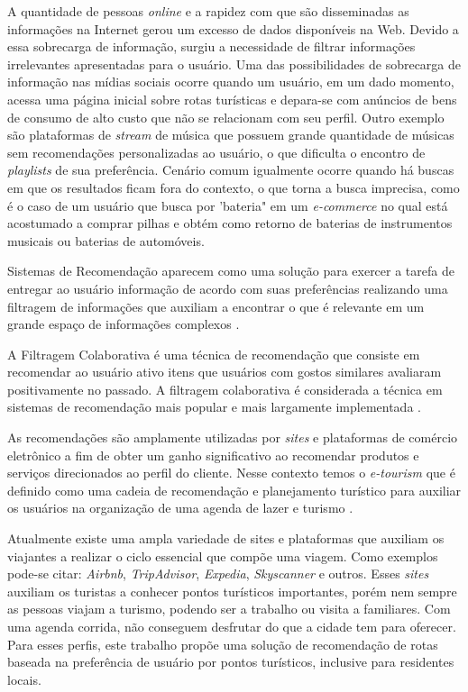 \documentclass[portuguese]{textolivre}
\begin{document}
A quantidade de pessoas \textit{online} e a rapidez com que são disseminadas as informações na Internet gerou um excesso de dados disponíveis na Web. Devido a essa sobrecarga de informação, surgiu a necessidade de filtrar informações irrelevantes apresentadas para o usuário. Uma das possibilidades de sobrecarga de informação nas mídias sociais ocorre quando um usuário, em um dado momento, acessa uma página inicial sobre rotas turísticas e depara-se com anúncios de bens de consumo de alto custo que não se relacionam com seu perfil. Outro exemplo são plataformas de \textit{stream} de música que possuem grande quantidade de músicas sem recomendações personalizadas ao usuário, o que dificulta o encontro de \textit{playlists} de sua preferência. Cenário comum igualmente ocorre quando há buscas em que os resultados ficam fora do contexto, o que torna a busca imprecisa, como é o caso de um usuário que busca por 'bateria" em um \textit{e-commerce} no qual está acostumado a comprar pilhas e obtém como retorno de baterias de instrumentos musicais ou baterias de automóveis.

Sistemas de Recomendação aparecem como uma solução para exercer a tarefa de entregar ao usuário informação de acordo com suas preferências realizando uma filtragem de informações que auxiliam a encontrar o que é relevante em um grande espaço de informações complexos \cite{DiNoia2015}.

A Filtragem Colaborativa é uma técnica de recomendação que consiste em recomendar ao usuário ativo itens que usuários com gostos similares avaliaram positivamente no passado. A filtragem colaborativa é considerada a técnica em sistemas de recomendação mais popular e mais largamente implementada \cite{Ricci:2010:RSH:1941884}.

As recomendações são amplamente utilizadas por \textit{sites} e plataformas de comércio eletrônico a fim de obter um ganho significativo ao recomendar produtos e serviços direcionados ao perfil do cliente. Nesse contexto temos o \textit{e-tourism} que é definido como uma cadeia de recomendação e planejamento turístico para auxiliar os usuários na organização de uma agenda de lazer e turismo \cite{sebastia2009tourism}.

Atualmente existe uma ampla variedade de sites e plataformas que auxiliam os viajantes a realizar o ciclo essencial que compõe uma viagem. Como exemplos pode-se citar: \textit{Airbnb}, \textit{TripAdvisor}, \textit{Expedia}, \textit{Skyscanner} e outros. Esses \textit{sites} auxiliam os turistas a conhecer pontos turísticos importantes, porém nem sempre as pessoas viajam a turismo, podendo ser a trabalho ou visita a familiares. Com uma agenda corrida, não conseguem desfrutar do que a cidade tem para oferecer. Para esses perfis, este trabalho propõe uma solução de recomendação de rotas baseada na preferência de usuário por pontos turísticos, inclusive para residentes locais. 
\end{document}
